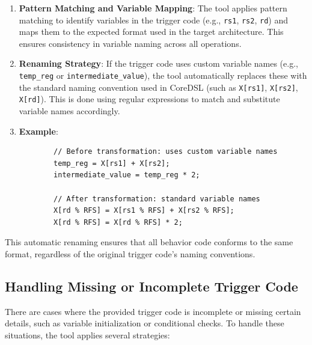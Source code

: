 \begin{enumerate}
    \item \textbf{Pattern Matching and Variable Mapping}: The tool applies pattern matching to identify variables in the trigger code (e.g., \texttt{rs1}, \texttt{rs2}, \texttt{rd}) and maps them to the expected format used in the target architecture. This ensures consistency in variable naming across all operations.

    \item \textbf{Renaming Strategy}: If the trigger code uses custom variable names (e.g., \texttt{temp\_reg} or \texttt{intermediate\_value}), the tool automatically replaces these with the standard naming convention used in CoreDSL (such as \texttt{X[rs1]}, \texttt{X[rs2]}, \texttt{X[rd]}). This is done using regular expressions to match and substitute variable names accordingly.

    \item \textbf{Example}:
    \begin{lstlisting}
        // Before transformation: uses custom variable names
        temp_reg = X[rs1] + X[rs2];
        intermediate_value = temp_reg * 2;

        // After transformation: standard variable names
        X[rd % RFS] = X[rs1 % RFS] + X[rs2 % RFS];
        X[rd % RFS] = X[rd % RFS] * 2;
    \end{lstlisting}
\end{enumerate}

This automatic renaming ensures that all behavior code conforms to the same format, regardless of the original trigger code's naming conventions.

\subsection{Handling Missing or Incomplete Trigger Code}

There are cases where the provided trigger code is incomplete or missing certain details, such as variable initialization or conditional checks. To handle these situations, the tool applies several strategies:

